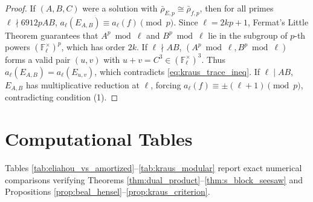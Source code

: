 \documentclass[11pt, a4paper]{amsart}
\theoremstyle{definition}
\newcommand{\F}{\mathbb{F}}
\begin{document}
\begin{proof}
If $(A, B, C)$ were a solution with $\bar{\rho}_{E,p} \cong \bar{\rho}_{f,p}$, then for all primes $\ell \nmid 6912 p AB$, $a_\ell(E_{A,B}) \equiv a_\ell(f) \pmod p$. Since $\ell = 2kp + 1$, Fermat's Little Theorem guarantees that $A^p \bmod \ell$ and $B^p \bmod \ell$ lie in the subgroup of $p$-th powers $(\F_\ell^\times)^p$, which has order $2k$. If $\ell \nmid AB$, $(A^p \bmod \ell, B^p \bmod \ell)$ forms a valid pair $(u, v)$ with $u+v = C^3 \in (\F_\ell^\times)^3$. Thus $a_\ell(E_{A,B}) = a_\ell(E_{u,v})$, which contradicts \eqref{eq:kraus_trace_ineq}. If $\ell \mid AB$, $E_{A,B}$ has multiplicative reduction at $\ell$, forcing $a_\ell(f) \equiv \pm (\ell + 1) \pmod p$, contradicting condition (1).
\end{proof}

\section{Computational Tables}

Tables \ref{tab:eliahou_vs_amortized}--\ref{tab:kraus_modular} report exact numerical comparisons verifying Theorems \ref{thm:dual_product}--\ref{thm:s_block_seesaw} and Propositions \ref{prop:beal_hensel}--\ref{prop:kraus_criterion}.
\end{document}
